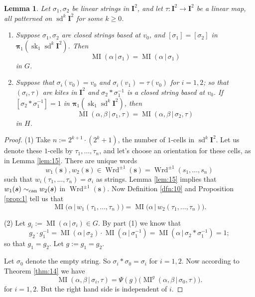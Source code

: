 \documentclass[10pt, a4paper]{amsart}
\newtheorem{lem}[equation]{Lemma}
\theoremstyle{definition}
\numberwithin{equation}{section}
\newcommand{\opn}{\operatorname}
\newcommand{\mbf}[1]{\mathbf{#1}}
\newcommand{\tup}[1]{\textup{#1}}
\newcommand{\bsym}[1]{\boldsymbol{#1}}
\renewcommand{\vert}{\, | \,}
\newcommand{\lb}{\linebreak}
\begin{document}
\begin{lem} \label{lem:11}
Let $\sigma_1, \sigma_2$ be linear strings in $\mbf{I}^2$, and let
$\tau : \mbf{I}^2 \to \mbf{I}^2$ be a linear map, all patterned on 
$\opn{sd}^k \mbf{I}^2$ for some $k \geq 0$. 
\begin{enumerate}
\item Suppose $\sigma_1, \sigma_2$ are closed strings based at $v_0$, and
$[\sigma_1] = [\sigma_2]$ in \lb 
$\bsym{\pi}_1(\opn{sk}_1 \opn{sd}^k \mbf{I}^2)$. 
Then 
\[ \opn{MI} (\alpha \vert \sigma_1) = \opn{MI} (\alpha \vert \sigma_1) \]
in $G$.
%
\item Suppose that $\sigma_i(v_0) = v_0$ and 
$\sigma_i(v_1) = \tau(v_0)$ for $i = 1, 2$; so that 
$(\sigma_i, \tau)$ are kites in $\mbf{I}^2$ and 
$\sigma_2 * \sigma_1^{-1}$ is a closed string based at $v_0$. 
If 
$[\sigma_2 * \sigma_1^{-1}] = 1$ in 
$\bsym{\pi}_1(\opn{sk}_1 \opn{sd}^k \mbf{I}^2)$, then 
\[ \opn{MI} (\alpha, \beta \vert \sigma_1, \tau) = 
\opn{MI} (\alpha, \beta \vert \sigma_2, \tau) \]
in $H$. 
\end{enumerate}
\end{lem}

\begin{proof}
(1) Take 
$n := 2^{k+1} \cdot (2^k + 1)$, the number of $1$-cells in 
$\opn{sd}^k \mbf{I}^2$. Let us denote these $1$-cells by
$\tau_1, \ldots, \tau_n$, and let's choose an orientation for these cells, as
in Lemma \ref{lem:15}. There are unique words 
\[ w_1(\bsym{s}), w_2(\bsym{s}) \in \opn{Wrd}^{\pm 1}(\bsym{s}) = 
\opn{Wrd}^{\pm 1}(s_1, \ldots, s_n) \]
such that 
$w_i(\tau_1, \ldots, \tau_n) = \sigma_i$ as strings. 
Lemma \ref{lem:15} implies that \lb
$w_1(\bsym{s}) \sim_{\tup{can}} w_2(\bsym{s})$ in 
$\opn{Wrd}^{\pm 1}(\bsym{s})$. Now Definition \ref{dfn:10} and Proposition
\ref{prop:1}
tell us that 
\[ \opn{MI} \bigl( \alpha \vert w_1(\tau_1, \ldots, \tau_n) \bigr) = 
\opn{MI} \bigl( \alpha \vert w_2(\tau_1, \ldots, \tau_n) \bigr) . \]

\medskip \noindent
(2) Let
$g_i := \opn{MI} (\alpha \vert \sigma_i) \in G$.
By part (1) we know that 
\[ g_2 \cdot g_1^{-1} = \opn{MI} (\alpha \vert \sigma_2) \cdot
\opn{MI} (\alpha \vert \sigma_1^{-1}) = 
\opn{MI} (\alpha \vert \sigma_2 * \sigma_1^{-1}) = 1 ; \]
so that $g_1 = g_2$. Let $g := g_1 = g_2$.

Let $\sigma_0$ denote the empty string. So
$\sigma_i * \sigma_0 = \sigma_i$ for $i = 1, 2$.
Now according to Theorem \ref{thm:14} we have 
\[ \opn{MI}(\alpha, \beta \vert \sigma_i, \tau) =
\Psi(g) \bigl( \opn{MI}^g (\alpha, \beta \vert \sigma_0, \tau) \bigr) . \]
for $i = 1, 2$. But the right hand side is independent of $i$.
\end{proof}
\end{document}
